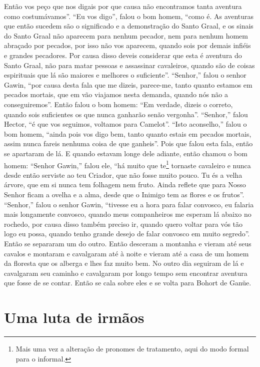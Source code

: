Então vos peço que nos digais por que causa não encontramos tanta aventura como
costumávamos”. “Eu vos digo”, falou o bom homem, “como é. As aventuras que então
sucedem são o significado e a demonstração do Santo Graal, e os sinais do Santo
Graal não aparecem para nenhum pecador, nem para nenhum homem abraçado por
pecados, por isso não vos aparecem, quando sois por demais infiéis e grandes
pecadores. Por causa disso deveis considerar que esta é aventura do Santo
Graal, não para matar pessoas e assassinar cavaleiros, quando são de coisas
espirituais que lá são maiores e melhores o suficiente”. “Senhor,”
falou o senhor Gawin, “por causa desta fala que me dizeis, parece-me, tanto
quanto estamos em pecados mortais, que em vão viajamos nesta demanda, quando
nós não a conseguiremos”. Então falou o bom homem: “Em verdade, dizeis o
correto, quando sois suficientes os que nunca ganharão senão vergonha”.
“Senhor,” falou Hector, “é que vos seguimos, voltamos para Camelot”. “Isto
aconselho,” falou o bom homem, “ainda pois vos digo bem,  tanto quanto estais
em pecados mortais, assim nunca fareis nenhuma coisa de que ganheis”. Pois que
falou esta fala, então se apartaram de lá. E quando estavam longe dele adiante,
então chamou o bom homem: “Senhor Gawin,” falou ele, “há muito que te\footnote{
Mais uma vez a alteração de pronomes de tratamento, aqui do modo formal para o
informal.}  tornaste cavaleiro e nunca desde então serviste ao teu
Criador, que não fosse muito pouco. Tu és a velha árvore, que em si nunca tem
folhagem nem fruto. Ainda reflete que para Nosso Senhor ficam a ovelha e a
alma, desde que o Inimigo tem as flores e os frutos”. “Senhor,” falou
o senhor Gawin, “tivesse eu a hora para falar convosco, eu falaria mais
longamente convosco, quando meus companheiros me esperam lá abaixo no rochedo,
por causa disso também preciso ir, quando quero voltar para vós tão logo eu
possa, quando tenho grande desejo de falar convosco em muito segredo”. Então se
separaram um do outro. Então desceram a montanha e vieram até seus cavalos e
montaram e cavalgaram até à noite e vieram até a casa de um homem da floresta
que os alberga e lhes faz muito bem. No outro dia seguiram de lá e cavalgaram
seu caminho e cavalgaram por longo tempo sem encontrar aventura que fosse de se
contar. Então se cala sobre eles e se volta para Bohort de Gan\u{u}e. 

\chapter{Uma luta de irmãos}

